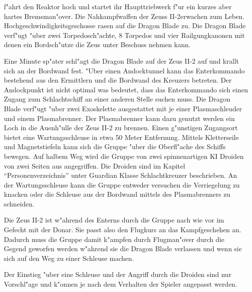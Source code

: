 \xl{} f"ahrt den Reaktor hoch und startet ihr Haupttriebwerk f"ur ein kurzes aber hartes Bremsman"over. Die Nahkampfwaffen der Zeuss II-2erwachen zum Leben. Hochgeschwindigkeitsgeschosse rasen auf die Dragon Blade zu. Die Dragon Blade verf"ugt "uber zwei Torpedosch"achte, 8 Torpedos und vier Railgungkanonen mit denen ein Bordsch"utze die Zeus unter Beschuss nehmen kann. 

Eine Minute sp"ater schl"agt die Dragon Blade auf der Zeus II-2 auf und krallt sich an der Bordwand fest. "Uber einen Andocktunnel kann das Enterkommando bestehend aus den Ermittlern und \xl{} die Bordwand des Kreuzers betreten. Der Andockpunkt ist nicht optimal was bedeutet, dass das Enterkommando sich einen Zugang zum Schlachtschiff an einer anderen Stelle suchen muss. Die Dragon Blade verf"ugt "uber zwei Exoskelette ausgestattet mit je einer Plasmaschleuder und einem Plasmabrenner. Der Plasmabrenner kann dazu genutzt werden ein Loch in die Au\3enh"ulle der Zeus II-2 zu brennen. Einen g"unstigen Zugangsort bietet eine Wartungsschleuse in etwa 50 Meter Entfernung. Mittels Kletterseile und Magnetstiefeln kann sich die Gruppe "uber die Oberfl"ache des Schiffs bewegen. Auf halbem Weg wird die Gruppe von zwei spinnenartigen KI Droiden von zwei Seiten aus angegriffen. Die Droiden sind im Kapitel "`Personenverzeichnis"' unter Guardian Klasse Schlachtkreuzer beschrieben. An der Wartungsschleuse kann die Gruppe entweder versuchen die Verriegelung zu knacken oder die Schleuse aus der Bordwand mittels des Plasmabrenners zu schneiden.

\begin{remarks}
	Die Zeus II-2 ist w"ahrend des Enterns durch die Gruppe nach wie vor im Gefecht mit der Donar. Sie passt also den Flugkurs an das Kampfgeschehen an. Dadurch muss die Gruppe damit k"ampfen durch Flugman"over durch die Gegend geworfen werden w"ahrend sie die Dragon Blade verlassen und wenn sie sich auf den Weg zu einer Schleuse machen.

	Der Einstieg "uber eine Schleuse und der Angriff durch die Droiden sind nur Vorschl"age und k"onnen je nach dem Verhalten der Spieler angepasst werden.
\end{remarks}
